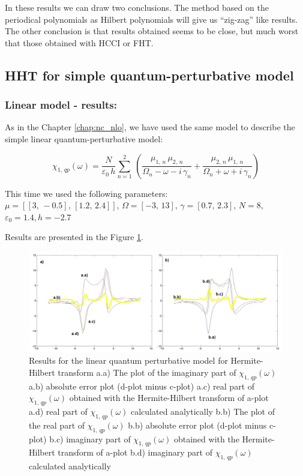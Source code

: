 \documentclass[12pt,twoside,a4paper]{article}
\numberwithin{equation}{subsection}
\numberwithin{figure}{subsection}
\begin{document}
In these results we can draw two conclusions. The method based on the periodical polynomials as Hilbert polynomials will
give us ``zig-zag'' like results. The other conclusion is that results obtained seems to be close, but much worst that those
obtained with HCCI or FHT. 

\subsection{HHT for simple quantum-perturbative model} \label{chap:hermite_quantum}

\subsubsection*{Linear model - results:}

As in the Chapter \ref{chap:nc_nlo}, we have used the same model to describe the simple linear quantum-perturbative model: 

\begin{equation} \label{eq:hht_qp}
  {\chi_{1, \,qp}}(\omega ) = \frac {N}{\varepsilon_0\,h} \sum_{n=1}^{2}\,(\frac {{\mu_{1, \,n}}\,{ \mu_{2, \,n}}}{{\Omega_{n}}
  - \omega  - i\,{\gamma_{n}}} + \frac {{\mu_{2, \,n}}\,{\mu_{1, \,n}}}{{\Omega_{n}} + \omega + i\,{\gamma_{n}}})
\end{equation}

This time we used the following parameters: \\
$\mu = [[3, \, - 0.5], \,[1.2, \,2.4]]$, 
$\Omega =[ - 3, \,13]$, 
$\gamma =[0.7, \,2.3]$,  
$N=8$, 
${\varepsilon_{0}}=1.4, 
h= - 2.7$

Results are presented in the Figure \ref{fig:hht_qp1}. 

\begin{figure}
  \includegraphics[width=150mm]{img/hht_qp1.png}
  \caption{Results for the linear quantum perturbative model for Hermite-Hilbert transform
    a.a) The plot of the imaginary part of ${\chi_{1, \,qp}}(\omega )$
    a.b) absolute error plot (d-plot minus c-plot) 
    a.c) real part of ${\chi_{1, \, qp}}(\omega )$ obtained with the Hermite-Hilbert transform of a-plot 
    a.d) real part of ${\chi_{1, \, qp}}(\omega )$ calculated analytically 
    b.b) The plot of the real part of ${\chi_{1, \, qp}}(\omega )$ 
    b.b) absolute error plot (d-plot minus c-plot) 
    b.c) imaginary part of ${\chi_{1, \, qp}}(\omega )$ obtained with the Hermite-Hilbert transform of a-plot 
    b.d) imaginary part of ${\chi_{1, \, qp}}(\omega )$ calculated analytically  
    \label{fig:hht_qp1}
  }
\end{figure}
\end{document}
